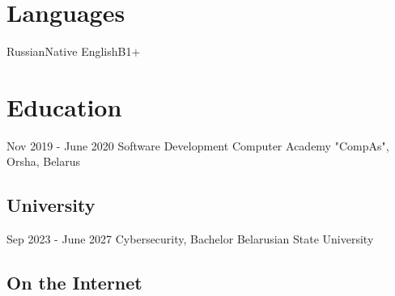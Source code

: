 \documentclass[11pt,a4paper]{moderncv}
\begin{document}
\section {Languages}
\cvline 
  {Russian}{Native}
\cvline 
  {English}{B1+}
\section{Education}
  \cventry
    {Nov 2019 - June 2020}
    {Software Development}
    {Computer Academy "CompAs", Orsha, Belarus}
    {}{}{}
  \subsection{University}
  \cventry
    {Sep 2023 - June 2027}
    {Cybersecurity, Bachelor}
    {Belarusian State University}
    {}{}{}


  \subsection{On the Internet}
\end{document}
